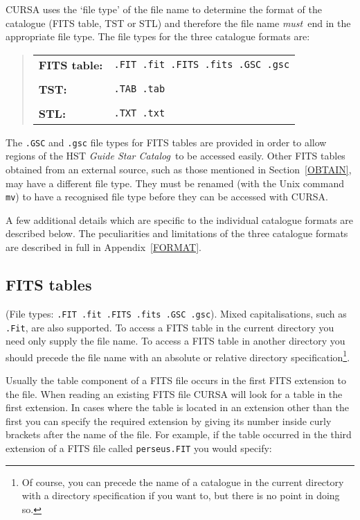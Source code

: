 \documentclass[twoside,11pt]{article}
\renewcommand{\_}{\texttt{\symbol{95}}}
\begin{document}
CURSA uses the `file type' of the file name to determine the format of
the catalogue (FITS table, TST or STL) and therefore the file name {\it
must}\, end in the appropriate file type.  The file types for the three
catalogue formats are:

\begin{quote}
\begin{tabular}{ll}
{\bf FITS table:} & {\tt .FIT .fit .FITS .fits .GSC .gsc}  \\
                  & \\
{\bf TST:}        & {\tt .TAB .tab}  \\
                  & \\
{\bf STL:}        & {\tt .TXT .txt}  \\
\end{tabular}
\end{quote}

The {\tt .GSC} and {\tt .gsc} file types for FITS tables are provided in
order to allow regions of the HST {\it Guide Star Catalog}\, to be accessed
easily. Other FITS tables obtained from an external source, such as those
mentioned in Section~\ref{OBTAIN}, may have a different file type. They
must be renamed (with the Unix command {\tt mv}) to have a recognised file
type before they can be accessed with CURSA.

A few additional details which are specific to the individual catalogue
formats are described below. The peculiarities and limitations of the
three catalogue formats are described in full in Appendix~\ref{FORMAT}.

\subsection{FITS tables}

(File types: {\tt .FIT .fit .FITS .fits .GSC .gsc}).  Mixed
capitalisations, such as {\tt .Fit}, are also supported.  To access a FITS
table in the current directory you need only supply the file name. To
access a FITS table in another directory you should precede the file name
with an absolute or relative directory specification\footnote{ Of course,
you can precede the name of a catalogue in the current directory with a
directory specification if you want to, but there is no point in doing
so.}.

Usually the table component of a FITS file occurs in the first FITS
extension to the file. When reading an existing FITS file CURSA will look
for a table in the first extension. In cases where the table is located
in an extension other than the first you can specify the required
extension by giving its number inside curly brackets after the name
of the file. For example, if the table occurred in the third extension
of a FITS file called {\tt perseus.FIT} you would specify:
\end{document}
